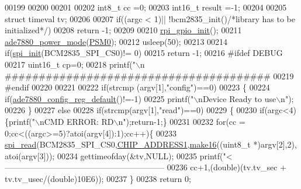 \begin{DoxyCode}
{{00199     
00200      
00201      
00202     int8\_t cc =0;
00203     int16\_t result =-1;
00204     
00205     \textcolor{keyword}{struct }timeval tv;
00206 
00207      \textcolor{keywordflow}{if}((argc < 1)|| !bcm2835\_init()\textcolor{comment}{/*library has to be initialized*/})   
00208            \textcolor{keywordflow}{return} -1;    
00209      
00210     \hyperlink{a00005_ga156b48448f55534a2f9c805a1f760efa}{rpi\_gpio\_init}();
00211     \hyperlink{a00005_gae9a5abd4e5054e7ea3f149b1764f2cd0}{ade7880\_power\_mode}(\hyperlink{a00037_ad03c0079a6239f78368cb14cc4578101}{PSM0});
00212     usleep(50);
00213     
00214     \textcolor{keywordflow}{if}(\hyperlink{a00005_ga96ddfd5c89b80852982ba50dd18256f6}{spi\_init}(BCM2835\_SPI\_CS0)!= 0)
00215     \textcolor{keywordflow}{return} -1;
00216 \textcolor{preprocessor}{        #ifdef DEBUG }
00217 \textcolor{preprocessor}{}        uint16\_t cp=0;
00218         printf(\textcolor{stringliteral}{"\(\backslash\)n
      #######################################%
00219 \textcolor{preprocessor}{        #endif}
00220 \textcolor{preprocessor}{}     
00221     
00222      \textcolor{keywordflow}{if}(strcmp (argv[1],\textcolor{stringliteral}{"config"})==0)
00223      \{
00224         \textcolor{keywordflow}{if}(\hyperlink{a00005_ga7782772c18e6ea515dcd28dcaedd0f06}{ade7880\_config\_reg\_default}()!=-1)
00225               printf(\textcolor{stringliteral}{"\(\backslash\)nDevice Ready to use\(\backslash\)n"});
00226      \} 
00227      \textcolor{keywordflow}{else} 
00228      \textcolor{keywordflow}{if}(strcmp(argv[1],\textcolor{stringliteral}{"read"})==0)   
00229      \{
00230         \textcolor{keywordflow}{if}(argc<4)\{printf(\textcolor{stringliteral}{"\(\backslash\)nCMD ERROR: RD\(\backslash\)n"});\textcolor{keywordflow}{return}-1;\}
00231           
00232         \textcolor{keywordflow}{for}(cc = 0;cc<((argc>=5)?atoi(argv[4]):1);cc++)\{
00233          \hyperlink{a00007_ga7ad9f65ee46aca507374096506a0b1c4}{spi\_read}(BCM2835\_SPI\_CS0,\hyperlink{a00037_a94de2b046db6e10257ef4481c0a15eaa}{CHIP\_ADDRESS1},\hyperlink{a00009_ga1e74920f34a07a82cca58eab71ed12b3}{make16}((uint8\_t *)argv[2],2),
      atoi(argv[3]));
00234          gettimeofday(&tv,NULL);
00235          printf(\textcolor{stringliteral}{"<----------------------------------------------------------- %
00236          cc+1,(\textcolor{keywordtype}{double})(tv.tv\_sec + tv.tv\_usec/(\textcolor{keywordtype}{double})10E6));
00237         \}
00238      \textcolor{keywordflow}{return} 0;
}}}}
\end{DoxyCode}

